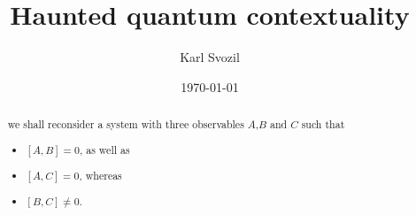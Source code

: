 \documentclass[%
  reprint,
  twocolumn,
  preprint,
 showpacs,
 showkeys,
 preprintnumbers,
 nofootinbib,
 amsmath,amssymb,
 aps,
 pra,
  longbibliography,
 ]{revtex4-2}
\begin{document}
\title{Haunted quantum contextuality}


\author{Karl Svozil}



\date{\today}


\begin{abstract}
we shall reconsider a system with three observables $A$,$B$ and $C$ such that
\begin{itemize}
\item
$[A,B]=0$, as well as
\item
$[A,C]=0$,
whereas
\item
$[B,C]\neq 0$.
\end{itemize}
\end{abstract}


\maketitle
\end{document}
